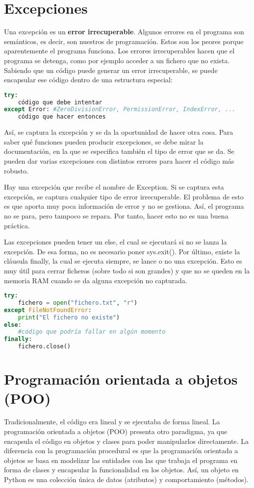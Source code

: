 \section{Excepciones}
Una excepción es un \textbf{error irrecuperable}. Algunos errores en el programa son semánticos, es decir, son nuestros de programación. Estos son los peores porque aparentemente el programa funciona. Los errores irrecuperables hacen que el programa se detenga, como por ejemplo acceder a un fichero que no exista. Sabiendo que un código puede generar un error irrecuperable, se puede encapsular ese código dentro de una estructura especial:
\begin{lstlisting}[language=Python]
try:
	código que debe intentar
except Error: #ZeroDivisionError, PermissionError, IndexError, ...
	código que hacer entonces
\end{lstlisting}
Así, se captura la excepción y se da la oportunidad de hacer otra cosa. Para saber qué funciones pueden producir excepciones, se debe mirar la documentación, en la que se especifica también el tipo de error que se da. Se pueden dar varias excepciones con distintos errores para hacer el código más robusto.

Hay una excepción que recibe el nombre de Exception. Si se captura esta excepción, se captura cualquier tipo de error irrecuperable. El problema de esto es que aporta muy poca información de error y no se gestiona. Así, el programa no se para, pero tampoco se repara. Por tanto, hacer esto no es una buena práctica. 

Las excepciones pueden tener un else, el cual se ejecutará si no se lanza la excepción. De esa forma, no es necesario poner sys.exit(). Por último, existe la cláusula finally, la cual se ejecuta siempre, se lance o no una excepción. Esto es muy útil para cerrar ficheros (sobre todo si son grandes) y que no se queden en la memoria RAM cuando se da alguna excepción no capturada. 
\begin{lstlisting}[language=Python]
try:
	fichero = open("fichero.txt", "r")
except FileNotFoundError:
	print("El fichero no existe")
else:
	#código que podría fallar en algún momento
finally:
	fichero.close()
\end{lstlisting}

\section{Programación orientada a objetos (POO)}
Tradicionalmente, el código era lineal y se ejecutaba de forma lineal. La programación orientada a objetos (POO) presenta otro paradigma, ya que encapsula el código en objetos y clases para poder manipularlos directamente. La diferencia con la programación procedural es que la programación orientada a objetos se basa en modelizar las entidades con las que trabaja el programa en forma de clases y encapsular la funcionalidad en los objetos. Así, un objeto en Python es una colección única de datos (atributos) y comportamiento (métodos).

